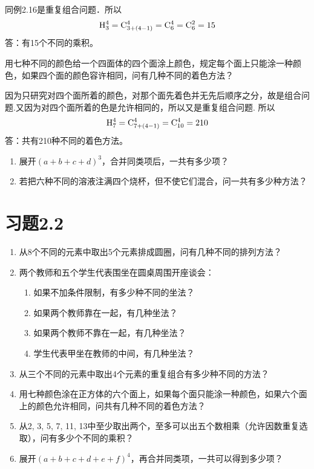 \begin{solution}
    同例2.16是重复组合问题．所以
    \[{\rm H}^4_3={\rm C}^{4}_{3+(4-1)}={\rm C}^{4}_{6}={\rm C}^{2}_{6}=15\]
答：有15个不同的乘积。
\end{solution}

\begin{example}
    用七种不同的颜色给一个四面体的四个面涂上颜色，规定每个面上只能涂一种颜色，如果四个面的颜色容许相同，问有几种不同的着色方法？
\end{example}

\begin{solution}
    因为只研究对四个面所着的颜色，对那个面先着色并无先后顺序之分，故是组合问题.又因为对四个面所着的色是允许相同的，所以又是重复组合问题. 所以
    \[{\rm H}^4_7={\rm C}^{4}_{7+(4-1)}={\rm C}^{4}_{10}=210\]
    答：共有210种不同的着色方法。
\end{solution}


\begin{ex}
\begin{enumerate}
\item 展开$(a+b+c+d)^3$，合并同类项后，一共有多少项？
\item 若把六种不同的溶液注满四个烧杯，但不使它们混合，问一共有多少种方法？
\end{enumerate}
\end{ex}

\section*{习题2.2}
\begin{enumerate}
\item 从8个不同的元素中取出5个元素排成圆圈，问有几种不同的排列方法？
\item 两个教师和五个学生代表围坐在圆桌周围开座谈会：
\begin{enumerate}[(1)]
\item 如果不加条件限制，有多少种不同的坐法？
\item 如果两个教师靠在一起，有几种坐法？
\item 如果两个教师不靠在一起，有几种坐法？
\item 学生代表甲坐在教师的中间，有几种坐法？
\end{enumerate}
\item 从三个不同的元素中取出4个元素的重复组合有多少种不同的方法？
\item 用七种颜色涂在正方体的六个面上，如果每个面只能涂一种颜色，如果六个面上的颜色允许相同，问共有几种不同的着色方法？
\item 从2, 3, 5, 7, 11, 13中至少取出两个，至多可以出五个数相乘（允许因数重复选取），问有多少个不同的乘积？
\item 展开$(a+b+c+d+e+f)^4$，再合并同类项，一共可以得到多少项？
\end{enumerate}

